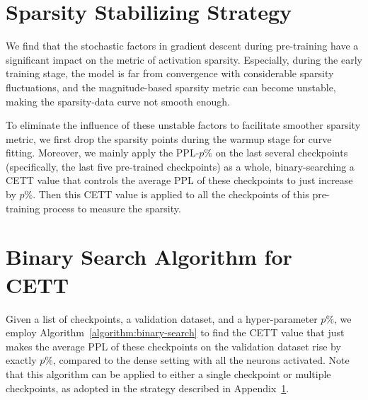 \documentclass{article} %
\begin{document}
\section{Sparsity Stabilizing Strategy} \label{sec:sparse-stable}

We find that the stochastic factors in gradient descent during pre-training have a significant impact on the metric of activation sparsity. Especially, during the early training stage, the model is far from convergence with considerable sparsity fluctuations, and the magnitude-based sparsity metric can become unstable, making the sparsity-data curve not smooth enough.

To eliminate the influence of these unstable factors to facilitate smoother sparsity metric, we first drop the sparsity points during the warmup stage for curve fitting. Moreover, we mainly apply the PPL-$p\%$ on the last several checkpoints (specifically, the last five pre-trained checkpoints) as a whole, binary-searching a CETT value that controls the average PPL of these checkpoints to just increase by $p\%$. Then this CETT value is applied to all the checkpoints of this pre-training process to measure the sparsity.

\section{Binary Search Algorithm for CETT} \label{sec:binary-search}
 
Given a list of checkpoints, a validation dataset, and a hyper-parameter $p\%$, we employ Algorithm~\ref{algorithm:binary-search} to find the CETT value that just makes the average PPL of these checkpoints on the validation dataset rise by exactly $p\%$, compared to the dense setting with all the neurons activated. 
Note that this algorithm can be applied to either a single checkpoint or multiple checkpoints, as adopted in the strategy described in Appendix~\ref{sec:sparse-stable}.

\end{document}

